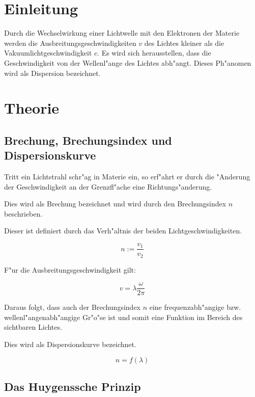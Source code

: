 \section{Einleitung} %
\label{sec:einleitung}

	Durch die Wechselwirkung einer Lichtwelle mit den Elektronen der Materie werden die Ausbreitungsgeschwindigkeiten $v$ des Lichtes kleiner als die Vakuumlichtgeschwindigkeit $c$.
	Es wird sich herausstellen, dass die Geschwindigkeit von der Wellenl"ange des Lichtes abh"angt. Dieses Ph"anomen wird als Dispersion bezeichnet.
	
\section{Theorie} %
\label{sec:theorie}

	\subsection{Brechung, Brechungsindex und Dispersionskurve} %
	\label{sub:brechungsindex}
	
	Tritt ein Lichtstrahl schr"ag in Materie ein, so erf"ahrt er durch die "Anderung der Geschwindigkeit an der Grenzfl"ache eine Richtungs"anderung.

	Dies wird als Brechung bezeichnet und wird durch den Brechungsindex $n$ beschrieben.

	Dieser ist definiert durch das Verh"altnis der beiden Lichtgeschwindigkeiten.

	\begin{equation}
		n := \frac{v_\mathrm{1}}{v_\mathrm{2}}  \label{gl:brechung}
	\end{equation}

	F"ur die Ausbreitungsgeschwindigkeit gilt:

	\begin{equation}
		v = \lambda \frac{\omega}{2\pi}
	\end{equation}

	Daraus folgt, dass auch der Brechungsindex $n$ eine frequenzabh"angige bzw.	wellenl"angenabh"angige Gr"o"se ist und somit eine Funktion im Bereich des sichtbaren Lichtes.

	Dies wird als Dispersionskurve bezeichnet.

	\begin{equation}
		n = f(\lambda) 
	\end{equation}

	\subsection{Das Huygenssche Prinzip} %
	\label{sub:das_huygenssche_prinzip}
	
